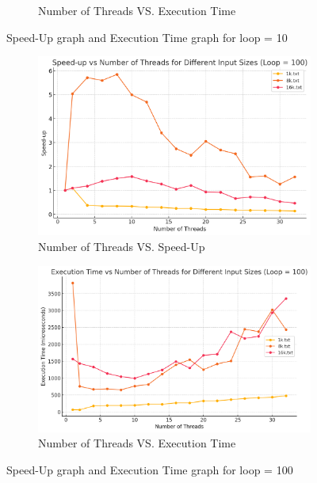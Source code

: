 \documentclass[letterpaper,12pt]{article}
\theoremstyle{remark}
\begin{document}
\begin{figure}[H]
\begin{subfigure}[t]{0.48\textwidth}
        \caption{Number of Threads VS. Execution Time}
        \label{fig:ThreadVsExecutionTime}
    \end{subfigure}
    \caption{Speed-Up graph and Execution Time graph for loop = 10}
    \label{fig:ThreadVsComparison}
\end{figure}

\hfill  %


\begin{figure}[H]
    \centering
    \begin{subfigure}[t]{0.48\textwidth}  %
        \centering
        \includegraphics[width=\textwidth]{loop100Sleep.png}
        \caption{Number of Threads VS. Speed-Up}
        \label{fig:ThreadVsSpeedUp1}
    \end{subfigure}
    \hfill  %
    \begin{subfigure}[t]{0.48\textwidth}  %
        \centering
        \includegraphics[width=\textwidth]{loop100ExecutionTime.png}
        \caption{Number of Threads VS. Execution Time}
        \label{fig:ThreadVsExecutionTime}
    \end{subfigure}
    \caption{Speed-Up graph and Execution Time graph for loop = 100}
    \label{fig:ThreadVsComparison}
\end{figure}
\end{document}
